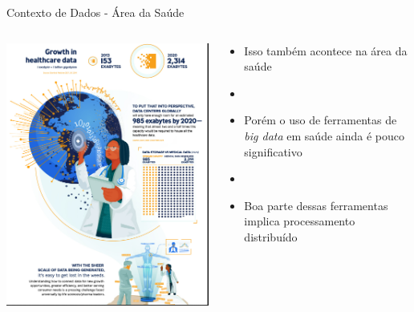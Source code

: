 \documentclass[10pt,brazil]{beamer}
\theoremstyle{definition}
\begin{document}
  \begin{frame}{Contexto de Dados - Área da Saúde}
    \begin{columns}
    \begin{column}{0.5\textwidth}
    \begin{center}
      \includegraphics[width=.9\textwidth,height=.75\textheight]{growthhealth.png}
      \end{center}
    \end{column}
    \begin{column}{0.5\textwidth}
      \begin{itemize}
        \item[] Isso também acontece na área da saúde
        \item[]
        \item[] Porém o uso de ferramentas de \emph{big data} em saúde ainda é pouco significativo
        \item[]
        \item[] Boa parte dessas ferramentas implica processamento distribuído
      \end{itemize}
    \end{column}
  \end{columns}
\end{frame}
\end{document}
